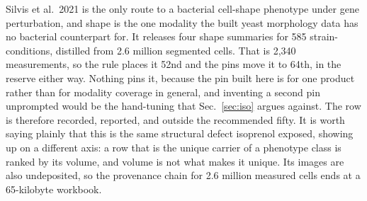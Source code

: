 Silvis et al.\ 2021 is the only route to a bacterial cell-shape phenotype under gene
perturbation, and shape is the one modality the built yeast morphology data has no
bacterial counterpart for. It releases four shape summaries for 585 strain-conditions,
distilled from 2.6 million segmented cells. That is 2,340 measurements, so the rule places
it 52nd and the pins move it to 64th, in the reserve either way. Nothing pins it, because the pin built here is for one product
rather than for modality coverage in general, and inventing a second pin unprompted would
be the hand-tuning that Sec.~\ref{sec:iso} argues against. The row is therefore recorded,
reported, and outside the recommended fifty. It is worth saying plainly that this is the
same structural defect isoprenol exposed, showing up on a different axis: a row that is
the unique carrier of a phenotype class is ranked by its volume, and volume is not what
makes it unique. Its images are also undeposited, so the provenance chain for 2.6 million
measured cells ends at a 65-kilobyte workbook.

\clearpage


\clearpage


\clearpage

